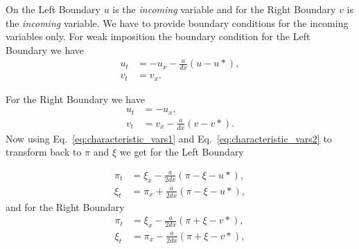 \documentclass[reprint, prd, nofootinbib, superscriptaddress, floatfix]{revtex4-2}  %
\newcommand{\eq}[1]{Eq.\ \eqref{#1}}
\newcommand{\SV}[1]{{\color{red}{[[Stamatis:: #1]]}}}
\begin{document}
On the Left Boundary $u$ is the \textit{incoming} variable and for the Right Boundary $v$ is the \textit{incoming} variable. We have to provide boundary conditions for the incoming variables only. For weak imposition the boundary condition for the Left Boundary we have
\begin{align}
  u_t &= -u_x - \frac{a}{dx} (u-u*),\\
  v_t &= v_x.
\end{align}

For the Right Boundary we have
\begin{align}
  u_t &= -u_x,\\
  v_t &= v_x - \frac{a}{dx} (v-v*).
\end{align}
Now using \eq{eq:characteristic_vars1} and \eq{eq:characteristic_vars2} to transform back to $\pi$ and $\xi$ we get for the Left Boundary


\begin{align}
  \pi_t &= \xi_x - \frac{a}{2dx} (\pi-\xi-u*),\\
  \xi_t &= \pi_x + \frac{a}{2dx} (\pi-\xi-u*),
\end{align}
and for the Right Boundary
\begin{align}
  \pi_t &= \xi_x - \frac{a}{2dx} (\pi+\xi-v*),\\
  \xi_t &= \pi_x - \frac{a}{2dx} (\pi+\xi-v*),
\end{align}
\SV{the 2 factor in dx stems from the transformation back. if I use the initial equations it doesnt appear.}
\end{document}
